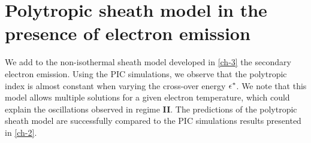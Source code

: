 



\chapter{Polytropic sheath model in the presence of electron emission}
\label{ch-4}

\begin{Chabstract}
  
We add to the non-isothermal sheath model developed in \cref{ch-3} the secondary electron emission.
Using the \ac{PIC} simulations, we observe that the polytropic index is almost constant when varying the cross-over energy $\epsilon^{*}$.
We note that this model allows multiple solutions for a given electron temperature, which could explain the oscillations observed in regime {\bf II}.
The predictions of the polytropic sheath model are successfully compared to the \ac{PIC} simulations results presented in \cref{ch-2}.
\end{Chabstract}

% 
% 
% 
% 
% 

